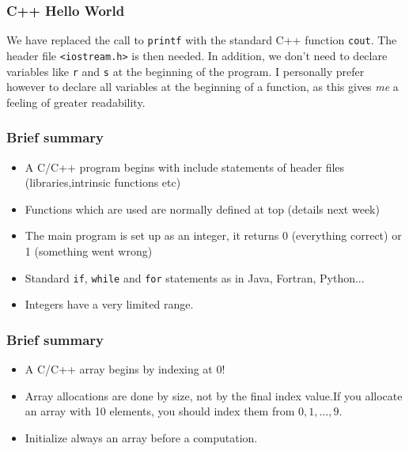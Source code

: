 \documentclass{beamer}
\newenvironment{block_mdfboxadmon}[1][]{\begin{block}{#1}}{\end{block}}
\begin{document}
\begin{frame}
\frametitle{C++ Hello World}

\begin{block_mdfboxadmon}[Dissection I.]
We have replaced the call to \Verb!printf! with the standard C++ function
\Verb!cout!. The header file \Verb!<iostream.h>! is then needed.
In addition, we don't need to
declare variables like \Verb!r! and \Verb!s!  at the beginning of the program.
I personally prefer
however to declare all variables at the beginning of a function, as this
gives \emph{me} a feeling of greater readability.
\end{block_mdfboxadmon}
\end{frame}

\begin{frame}
\frametitle{Brief summary}

\begin{block_mdfboxadmon}[C/C++ program.]
\begin{itemize}
  \item A C/C++ program begins with include statements of header files (libraries,intrinsic functions etc)

  \item Functions which are used are normally defined at top (details next week)

  \item The main program is set up as an integer, it returns 0 (everything correct) or 1 (something went wrong)

  \item Standard \Verb!if!, \Verb!while! and \Verb!for! statements as in Java, Fortran, Python...

  \item Integers have a very limited range.
\end{itemize}

\noindent
\end{block_mdfboxadmon}
\end{frame}

\begin{frame}
\frametitle{Brief summary}

\begin{block_mdfboxadmon}[Arrays.]
\begin{itemize}
  \item A C/C++ array begins by indexing at 0!

  \item Array allocations are done by size, not by the final index value.If you allocate an array with 10 elements, you should index them from $0,1,\dots, 9$.

  \item Initialize always an array before a computation.
\end{itemize}

\noindent
\end{block_mdfboxadmon}
\end{frame}
\end{document}
